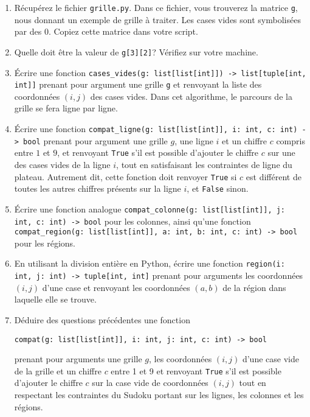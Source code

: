 \documentclass{magnolia}
\begin{document}
\begin{enumerate}
\item Récupérez le fichier \texttt{grille.py}. Dans ce fichier, vous trouverez la matrice \texttt{g}, nous donnant un exemple de grille à traiter. Les cases vides sont symbolisées par des $0$. Copiez cette matrice dans votre script.
\item Quelle doit être la valeur de \texttt{g[3][2]}? Vérifiez sur votre machine.
\item Écrire une fonction \verb!cases_vides(g: list[list[int]]) -> list[tuple[int, int]]!  prenant pour argument une grille \verb!g! et renvoyant la liste des coordonnées $(i,j)$
des cases vides. Dans cet algorithme, le parcours de la grille se fera ligne par ligne.
\item Écrire une fonction \verb!compat_ligne(g: list[list[int]], i: int, c: int) -> bool!
   prenant pour argument une grille $g$, une ligne $i$ et un chiffre
   $c$ compris entre $1$ et $9$, et renvoyant \verb!True! s'il est possible
   d'ajouter le chiffre $c$ sur une des cases vides de la ligne $i$, tout en satisfaisant
   les contraintes de ligne du plateau. Autrement dit, cette fonction doit renvoyer
   \verb!True! si $c$ est différent de toutes les autres chiffres présents sur la ligne
   $i$, et \verb!False! sinon.
\item Écrire une fonction analogue
  \verb!compat_colonne(g: list[list[int]], j: int, c: int) -> bool! pour les colonnes,
  ainsi qu'une fonction
  \verb!compat_region(g: list[list[int]], a: int, b: int, c: int) -> bool! pour les
  régions.
\item En utilisant la division entière en Python, écrire une fonction
  \verb!region(i: int, j: int) -> tuple[int, int]! prenant pour arguments les
  coordonnées $(i,j)$ d'une case et renvoyant les coordonnées $(a,b)$ de la région
  dans laquelle elle se trouve.
\item Déduire des questions précédentes une fonction
  \begin{center}
    \verb!compat(g: list[list[int]], i: int, j: int, c: int) -> bool!
  \end{center}
  prenant pour
  arguments une grille $g$, les coordonnées $(i,j)$ d'une case vide
  de la grille et un chiffre $c$ entre 1 et 9 et renvoyant \verb!True! s'il est
  possible d'ajouter le chiffre $c$ sur la case vide  de coordonnées $(i,j)$ tout
  en respectant les contraintes du Sudoku portant sur les lignes, les colonnes et
  les régions.
\end{enumerate}
\end{document}
